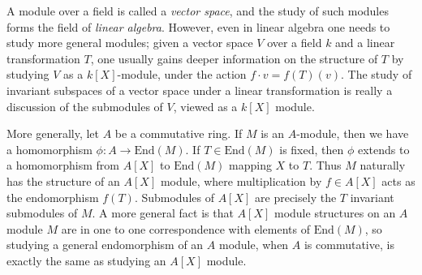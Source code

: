 \begin{example}
    A module over a field is called a \emph{vector space}, and the study of such modules forms the field of \emph{linear algebra}. However, even in linear algebra one needs to study more general modules; given a vector space $V$ over a field $k$ and a linear transformation $T$, one usually gains deeper information on the structure of $T$ by studying $V$ as a $k[X]$-module, under the action $f \cdot v = f(T) (v)$. The study of invariant subspaces of a vector space under a linear transformation is really a discussion of the submodules of $V$, viewed as a $k[X]$ module.

    More generally, let $A$ be a commutative ring. If $M$ is an $A$-module, then we have a homomorphism $\phi: A \to \text{End}(M)$. If $T \in \text{End}(M)$ is fixed, then $\phi$ extends to a homomorphism from $A[X]$ to $\text{End}(M)$ mapping $X$ to $T$. Thus $M$ naturally has the structure of an $A[X]$ module, where multiplication by $f \in A[X]$ acts as the endomorphism $f(T)$. Submodules of $A[X]$ are precisely the $T$ invariant submodules of $M$. A more general fact is that $A[X]$ module structures on an $A$ module $M$ are in one to one correspondence with elements of $\text{End}(M)$, so studying a general endomorphism of an $A$ module, when $A$ is commutative, is exactly the same as studying an $A[X]$ module. 
\end{example}

